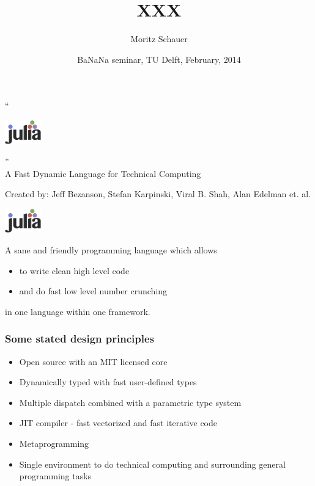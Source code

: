 \documentclass{beamer}
\title[]{XXX} %
\subtitle{}
\author[M. Schauer]{Moritz Schauer}
\date[Delft '14]{BaNaNa seminar, TU Delft, February, 2014}
\begin{document}
\begin{frame}
\begin{center}
{\large {\Huge ``} \hspace{4.0cm} \begin{minipage}[c]{15.5mm}\includegraphics[width=15.5mm]{img/logo_hires.png}\end{minipage}\hspace{4.0cm} {\Huge''} \\[2mm]
 A Fast Dynamic Language for Technical Computing 

\vspace{2cm}
Created by: Jeff Bezanson, Stefan Karpinski, Viral B. Shah, Alan Edelman et. al.

}
\end{center}
\end{frame}

\begin{frame}

{\large
\begin{center} \begin{minipage}[c]{15.5mm}\includegraphics[width=15.5mm]{img/logo_hires.png}\end{minipage}\end{center}

A sane and friendly programming language which allows
\begin{itemize}
\item  to write clean high level code 
\item and do fast low level number crunching
\end{itemize}
in one language within one framework.
}


\end{frame}


\begin{frame}\frametitle{Some stated design principles}
\begin{itemize}
\item Open source with an MIT licensed core
\item Dynamically typed with fast user-defined types
\item Multiple dispatch combined with a parametric type system
\item JIT compiler - fast vectorized and fast iterative code
\item Metaprogramming
\item Single environment to do technical computing and surrounding general programming tasks
\end{itemize}

\end{frame}
\end{document}
